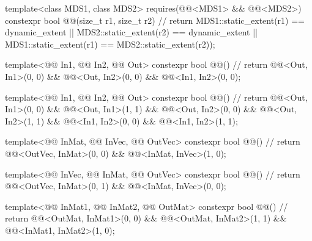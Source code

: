 \begin{codeblock}
template<class MDS1, class MDS2>
  requires(@@<MDS1> && @@<MDS2>)
  constexpr
  bool @@(size_t r1, size_t r2) {         // \expos
    return MDS1::static_extent(r1) == dynamic_extent ||
           MDS2::static_extent(r2) == dynamic_extent ||
           MDS1::static_extent(r1) == MDS2::static_extent(r2));
  }

template<@@ In1, @@ In2, @@ Out>
  constexpr bool @@() {                            // \expos
    return @@<Out, In1>(0, 0) &&
           @@<Out, In2>(0, 0) &&
           @@<In1, In2>(0, 0);
  }

template<@@ In1, @@ In2, @@ Out>
  constexpr bool @@() {                            // \expos
    return @@<Out, In1>(0, 0) &&
           @@<Out, In1>(1, 1) &&
           @@<Out, In2>(0, 0) &&
           @@<Out, In2>(1, 1) &&
           @@<In1, In2>(0, 0) &&
           @@<In1, In2>(1, 1);
  }

template<@@ InMat, @@ InVec, @@ OutVec>
  constexpr bool @@() {                       // \expos
    return @@<OutVec, InMat>(0, 0) &&
           @@<InMat, InVec>(1, 0);
  }

template<@@ InVec, @@ InMat, @@ OutVec>
  constexpr bool @@() {                       // \expos
    return @@<OutVec, InMat>(0, 1) &&
           @@<InMat, InVec>(0, 0);
  }

template<@@ InMat1, @@ InMat2, @@ OutMat>
  constexpr bool @@() {                       // \expos
    return @@<OutMat, InMat1>(0, 0) &&
           @@<OutMat, InMat2>(1, 1) &&
           @@<InMat1, InMat2>(1, 0);
  }
\end{codeblock}

